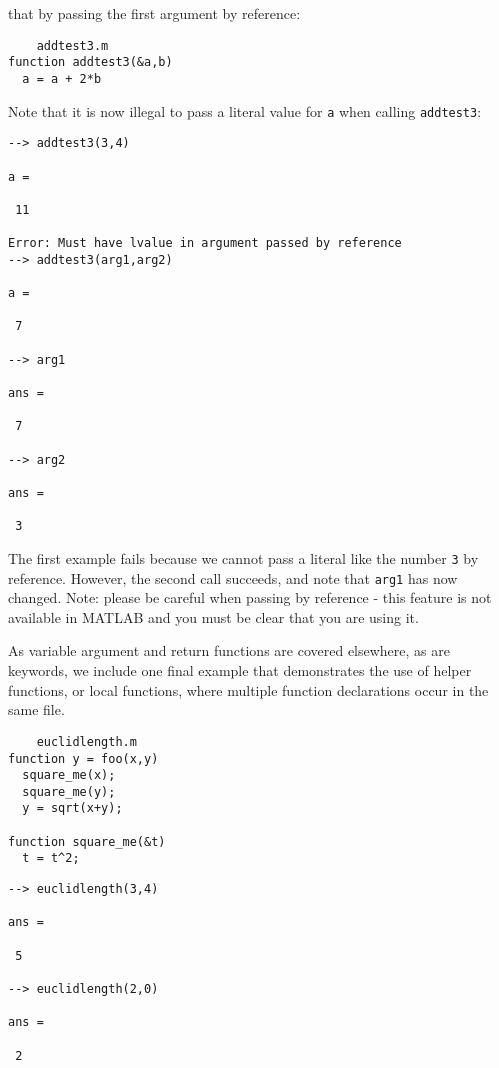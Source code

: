 that by passing the first argument by reference:
\begin{verbatim}
    addtest3.m
function addtest3(&a,b)
  a = a + 2*b
\end{verbatim}
Note that it is now illegal to pass a literal value for \verb|a| when
calling \verb|addtest3|:
\begin{verbatim}
--> addtest3(3,4)

a = 

 11 

Error: Must have lvalue in argument passed by reference
--> addtest3(arg1,arg2)

a = 

 7 

--> arg1

ans = 

 7 

--> arg2

ans = 

 3 
\end{verbatim}
The first example fails because we cannot pass a literal like the
number \verb|3| by reference.  However, the second call succeeds, and
note that \verb|arg1| has now changed.  Note: please be careful when
passing by reference - this feature is not available in MATLAB
and you must be clear that you are using it.

As variable argument and return functions are covered elsewhere,
as are keywords, we include one final example that demonstrates
the use of helper functions, or local functions, where
multiple function declarations occur in the same file.
\begin{verbatim}
    euclidlength.m
function y = foo(x,y)
  square_me(x);
  square_me(y);
  y = sqrt(x+y);

function square_me(&t)
  t = t^2;
\end{verbatim}
\begin{verbatim}
--> euclidlength(3,4)

ans = 

 5 

--> euclidlength(2,0)

ans = 

 2 
\end{verbatim}
